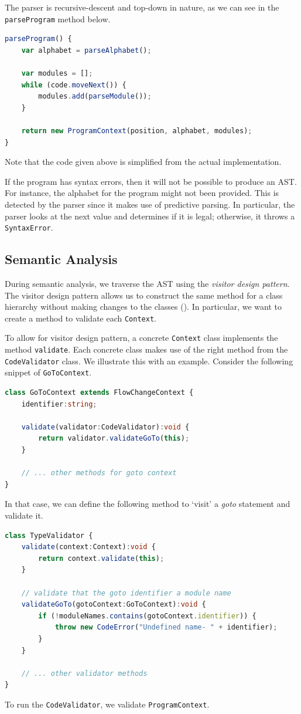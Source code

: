The parser is recursive-descent and top-down in nature, as we can see in the \texttt{parseProgram} method below.
\begin{lstlisting}[language=TypeScript]
parseProgram() {
    var alphabet = parseAlphabet();
    
    var modules = [];
    while (code.moveNext()) {
        modules.add(parseModule());
    }
    
    return new ProgramContext(position, alphabet, modules);
}
\end{lstlisting}
Note that the code given above is simplified from the actual implementation.

If the program has syntax errors, then it will not be possible to produce an AST. For instance, the alphabet for the program might not been provided. This is detected by the parser since it makes use of predictive parsing. In particular, the parser looks at the next value and determines if it is legal; otherwise, it throws a \texttt{SyntaxError}.

\subsection{Semantic Analysis}
During semantic analysis, we traverse the AST using the \emph{visitor design pattern}. The visitor design pattern allows us to construct the same method for a class hierarchy without making changes to the classes (\cite{gamma1995design}). In particular, we want to create a method to validate each \texttt{Context}.

To allow for visitor design pattern, a concrete \texttt{Context} class implements the method \texttt{validate}. Each concrete class makes use of the right method from the \texttt{CodeValidator} class. We illustrate this with an example. Consider the following snippet of \texttt{GoToContext}.
\begin{lstlisting}[language=TypeScript]
class GoToContext extends FlowChangeContext {    
    identifier:string;
    
    validate(validator:CodeValidator):void {
        return validator.validateGoTo(this);
    }

    // ... other methods for goto context
}
\end{lstlisting}
    In that case, we can define the following method to `visit' a \textit{goto} statement and validate it.
\begin{lstlisting}[language=TypeScript]
class TypeValidator {
    validate(context:Context):void {
        return context.validate(this);
    }
    
    // validate that the goto identifier a module name
    validateGoTo(gotoContext:GoToContext):void {
        if (!moduleNames.contains(gotoContext.identifier)) {
            throw new CodeError("Undefined name- " + identifier);
        }
    }

    // ... other validator methods
}
\end{lstlisting}
To run the \texttt{CodeValidator}, we validate \texttt{ProgramContext}.


